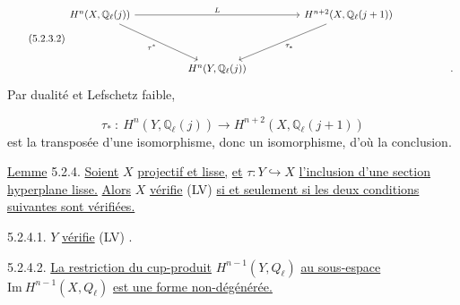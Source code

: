 \begin{equation}\tag{5.2.3.2}
\begin{tikzcd}[column sep=huge, row sep=huge]
H^n(X,\mathbb{Q}_\ell(j)) \arrow[rr, "L"] \arrow[dr, "\tau^*"'] & {} & H^{n+2}(X,\mathbb{Q}_\ell(j+1)) \arrow[dl, "\tau_*"] \\
{} & H^n(Y,\mathbb{Q}_\ell(j)) & {} & {.}
\end{tikzcd}
\end{equation}
Par dualité et Lefschetz faible,

\begin{equation*}
\tau_* \ :\ H^n(Y,\mathbb{Q}_\ell(j)) \longrightarrow H^{n+2}(X,\mathbb{Q}_\ell(j+1))
\end{equation*}
est la transposée d'une isomorphisme, donc un isomorphisme, d'où la conclusion.

\underline{Lemme} 5.2.4.  \underline{Soient} $X$ \underline{projectif et lisse,} \underline{et} $\tau : Y \hookrightarrow X$ \underline{l'inclusion d'une section hyperplane lisse.} \underline{Alors} $X$ \underline{vérifie} (LV) \underline{si et seulement si les deux conditions suivantes sont vérifiées.}

5.2.4.1.  $Y$ \underline{vérifie} (LV) .

5.2.4.2.  \underline{La restriction du cup-produit} $H^{n-1}(Y,Q_\ell)$ \underline{au sous-espace} $\mathrm{Im}\ H^{n-1}(X,Q_\ell)$ \underline{est une forme non-dégénérée.}

